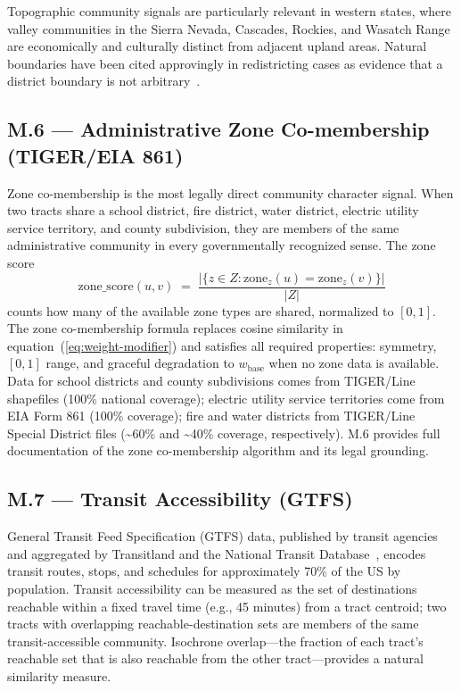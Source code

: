 Topographic community signals are particularly relevant in western states, where
valley communities in the Sierra Nevada, Cascades, Rockies, and Wasatch Range are
economically and culturally distinct from adjacent upland areas.
Natural boundaries have been cited approvingly in redistricting cases as evidence
that a district boundary is not arbitrary~\citep{ncsl2021criteria}.

\subsection{M.6 --- Administrative Zone Co-membership (TIGER/EIA 861)}

Zone co-membership is the most legally direct community character signal.
When two tracts share a school district, fire district, water district, electric
utility service territory, and county subdivision, they are members of the same
administrative community in every governmentally recognized sense.
The zone score
\begin{equation}
  \mathrm{zone\_score}(u,v) \;=\; \frac{|\{z \in Z : \mathrm{zone}_z(u) = \mathrm{zone}_z(v)\}|}{|Z|}
  \label{eq:zone-score}
\end{equation}
counts how many of the available zone types are shared, normalized to $[0,1]$.
The zone co-membership formula replaces cosine similarity in equation~(\ref{eq:weight-modifier})
and satisfies all required properties: symmetry, $[0,1]$ range, and graceful degradation
to $w_{\mathrm{base}}$ when no zone data is available.
Data for school districts and county subdivisions comes from TIGER/Line shapefiles
(100\% national coverage); electric utility service territories come from EIA
Form 861 (100\% coverage); fire and water districts from TIGER/Line Special District
files (\textasciitilde 60\% and \textasciitilde 40\% coverage, respectively).
M.6 provides full documentation of the zone co-membership algorithm and its legal grounding.

\subsection{M.7 --- Transit Accessibility (GTFS)}

General Transit Feed Specification (GTFS) data, published by transit agencies and
aggregated by Transitland and the National Transit Database~\citep{ntd2022},
encodes transit routes, stops, and schedules for approximately 70\% of the US
by population.
Transit accessibility can be measured as the set of destinations reachable within
a fixed travel time (e.g., 45 minutes) from a tract centroid; two tracts with
overlapping reachable-destination sets are members of the same transit-accessible
community.
Isochrone overlap---the fraction of each tract's reachable set that is also reachable
from the other tract---provides a natural similarity measure.

